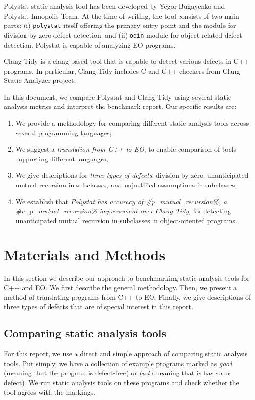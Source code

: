 Polystat static analysis tool has been developed by Yegor Bugayenko and Polystat Innopolis Team. At the time of writing, the tool consists of two main parts: (i) \texttt{polystat} itself offering the primary entry point and the module for division-by-zero defect detection, and (ii) \texttt{odin} module for object-related defect detection. Polystat is capable of analyzing EO programs.

Clang-Tidy is a clang-based tool that is capable to detect various defects in C++ programs. In particular, Clang-Tidy includes C and C++ checkers from Clang Static Analyzer project.

In this document, we compare Polystat and Clang-Tidy using several static analysis metrics and interpret the benchmark report. Our specific results are:
\begin{enumerate}
    \item We provide a methodology for comparing different static analysis tools across several programming languages;
    \item We suggest a \emph{translation from C++ to EO}, to enable comparison of tools supporting different languages;
    \item We give descriptions for \emph{three types of defects}: division by zero, unanticipated mutual recursion in subclasses, and unjustified assumptions in subclasses;
    \item We establish that \emph{Polystat has accuracy of #p_mutual_recursion\%, a #c_p_mutual_recursion\% improvement over Clang-Tidy}, for detecting unanticipated mutual recursion in subclasses in object-oriented programs.
\end{enumerate}

\section{Materials and Methods}

In this section we describe our approach to benchmarking static analysis tools for C++ and EO. We first describe the general methodology. Then, we present a method of translating programs from C++ to EO. Finally, we give descriptions of three types of defects that are of special interest in this report.

\subsection{Comparing static analysis tools}

For this report, we use a direct and simple approach of comparing static analysis tools. Put simply, we have a collection of example programs marked as \emph{good} (meaning that the program is defect-free) or \emph{bad} (meaning that is has some defect). We run static analysis tools on these programs and check whether the tool agrees with the markings.


